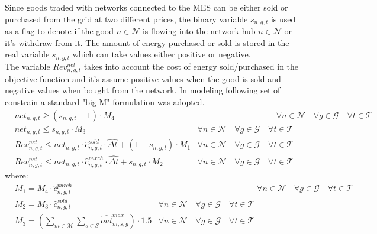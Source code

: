 \documentclass{article}
\newcommand{\cT}{{\mathcal T}}
\newcommand{\cM}{{\mathcal M}}
\newcommand{\cS}{{\mathcal S}}
\newcommand{\cES}{{\mathcal ES}}
\newcommand{\cN}{{\mathcal N}}
\newcommand{\cG}{{\mathcal G}}
\begin{document}
{\begin{comment}
		& l_{es,0}^{stor} = \hat{L}_{es}^{stor,0} \cdot x_{es}^{stor, D} &\forall es \in \cES \label{eq: Stor_init}\\
		& l_{es,0}^{stor} = l_{es, T}^{stor} &\forall es \in \cES \label{eq:Stor_boundaries}
		\end{align}
\end{comment}
Since goods traded with networks connected to the MES can be either sold or purchased from the grid at two different prices, the binary variable $s_{n,g,t}$ is used as a flag to denote if the good $n \in \cN$ is flowing into the network hub $n \in \cN$ or it's withdraw from it. The amount of energy purchased or sold is stored in the real variable $s_{n,g,t}$ which can take values either positive or negative. \\
The variable $Rev_{n,g,t}^{net}$ takes into account the cost of energy sold/purchased in the objective function and it's assume positive values when the good is sold and negative values when bought from the network. In modeling following set of constrain a standard "big M" formulation was adopted.  
		\begin{align}
		& net_{n,g,t} \geq (s_{n,g,t} - 1) \cdot M_{4}& \hspace{4cm} \forall n \in \cN \quad \forall g \in \cG \quad \forall t \in \cT \label{eq:Net_1}\\
		& net_{n,g,t} \leq s_{n,g,t} \cdot M_{3} & \forall n \in \cN \quad \forall g \in \cG \quad \forall t \in \cT \label{eq:Net_2}\\
		& Rev_{n,g,t}^{net} \leq net_{n,g,t} \cdot \hat{c}_{n,g,t}^{sold} \cdot \hat{\Delta t} + (1-s_{n,g,t}) \cdot M_{1}&\forall n \in \cN \quad \forall g \in \cG \quad \forall t \in \cT \label{eq:Net_3}\\
		& Rev_{n,g,t}^{net} \leq net_{n,g,t} \cdot \hat{c}_{n,g,t}^{purch} \cdot \hat{\Delta t} + s_{n,g,t} \cdot M_{2} &\forall n \in \cN \quad \forall g \in \cG \quad \forall t \in \cT \label{eq:Net_4}
		\end{align}
		where: 
		\begin{align}
		& M_{1} = M_{4} \cdot \hat{c}_{n,g,t}^{purch} & \hspace{5cm} \forall n \in \cN \quad \forall g \in \cG \quad \forall t \in \cT \label{eq:M1}\\
		& M_{2} = M_{3} \cdot \hat{c}_{n,g,t}^{sold} &\forall n \in \cN \quad \forall g \in \cG \quad \forall t \in \cT \label{eq:M2}\\
		& M_{3} = \left( \sum_{m \in \cM} \sum_{s \in \cS} \hat{out}_{m,s,g}^{max} \right) \cdot 1.5 & \forall n \in \cN \quad \forall g \in \cG \quad \forall t \in \cT \label{eq:M3}\\

\end{align}}
\end{document}
